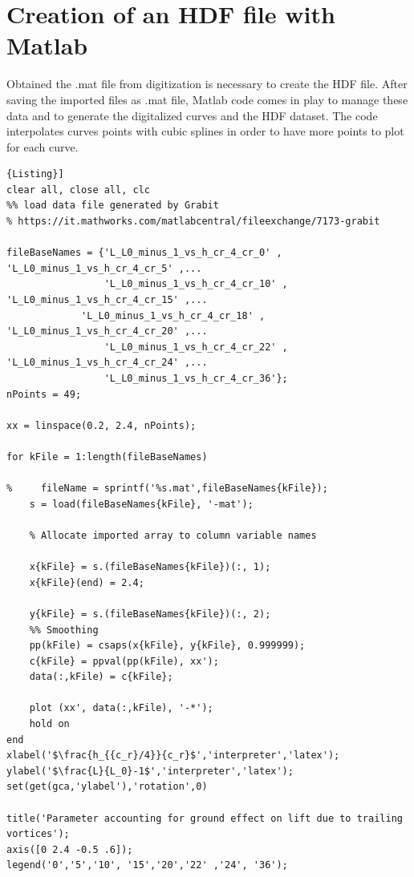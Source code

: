 \section{Creation of an HDF file with Matlab}

Obtained the .mat file from digitization is necessary to create the HDF file. After saving the imported files as .mat file, Matlab code comes in play to manage these data and to generate the digitalized curves and the HDF dataset.  The code interpolates curves points with cubic splines in order to have more points to plot for each curve.

\bigskip
\lstset{language=Matlab}
\begin{lstlisting}[frame=rbl,caption={{\footnotesize MATLAB script for creating the HDF Database}},label= [style=\bfseries]{Listing}]
clear all, close all, clc
%% load data file generated by Grabit
% https://it.mathworks.com/matlabcentral/fileexchange/7173-grabit

fileBaseNames = {'L_L0_minus_1_vs_h_cr_4_cr_0' , 'L_L0_minus_1_vs_h_cr_4_cr_5' ,...
                 'L_L0_minus_1_vs_h_cr_4_cr_10' ,  'L_L0_minus_1_vs_h_cr_4_cr_15' ,...
	         'L_L0_minus_1_vs_h_cr_4_cr_18' , 'L_L0_minus_1_vs_h_cr_4_cr_20' ,...
                 'L_L0_minus_1_vs_h_cr_4_cr_22' , 'L_L0_minus_1_vs_h_cr_4_cr_24' ,...
                 'L_L0_minus_1_vs_h_cr_4_cr_36'};
nPoints = 49;

xx = linspace(0.2, 2.4, nPoints);

for kFile = 1:length(fileBaseNames)
    
%     fileName = sprintf('%s.mat',fileBaseNames{kFile});
    s = load(fileBaseNames{kFile}, '-mat');

    % Allocate imported array to column variable names
    
    x{kFile} = s.(fileBaseNames{kFile})(:, 1);
    x{kFile}(end) = 2.4;
    
    y{kFile} = s.(fileBaseNames{kFile})(:, 2);
    %% Smoothing
    pp(kFile) = csaps(x{kFile}, y{kFile}, 0.999999);
    c{kFile} = ppval(pp(kFile), xx');
    data(:,kFile) = c{kFile};

    plot (xx', data(:,kFile), '-*');
    hold on
end
xlabel('$\frac{h_{{c_r}/4}}{c_r}$','interpreter','latex'); 
ylabel('$\frac{L}{L_0}-1$','interpreter','latex');
set(get(gca,'ylabel'),'rotation',0)

title('Parameter accounting for ground effect on lift due to trailing vortices');
axis([0 2.4 -0.5 .6]);
legend('0','5','10', '15','20','22' ,'24', '36');



\end{lstlisting}
